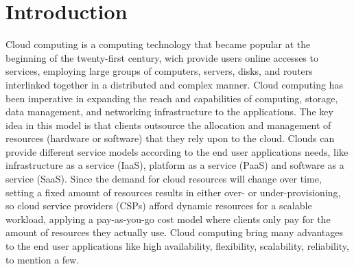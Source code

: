 \section{Introduction}\label{sec:Introduction}
\noindent
Cloud computing is a computing technology that became popular at the beginning of the twenty-first century, wich provide users online accesses to services, employing large groups of computers, servers, disks, and routers interlinked together in a distributed and complex manner. Cloud computing has been imperative in expanding the reach and capabilities of computing, storage, data management, and networking infrastructure to the applications. The key idea in this model is that clients outsource the allocation and management of resources (hardware or software) that they rely upon to the cloud. Clouds can provide different service models according to the end user applications needs, like infrastructure as a service (IaaS), platform as a service (PaaS) and software as a service (SaaS). Since the demand for cloud resources will change over time, setting a fixed amount of resources results in either over- or under-provisioning, so cloud service providers (CSPs) afford dynamic resources for a scalable workload, applying a pay-as-you-go cost model where clients only pay for the amount of resources they actually use. Cloud computing bring many advantages to the end user applications like high availability, flexibility, scalability, reliability, to mention a few.
